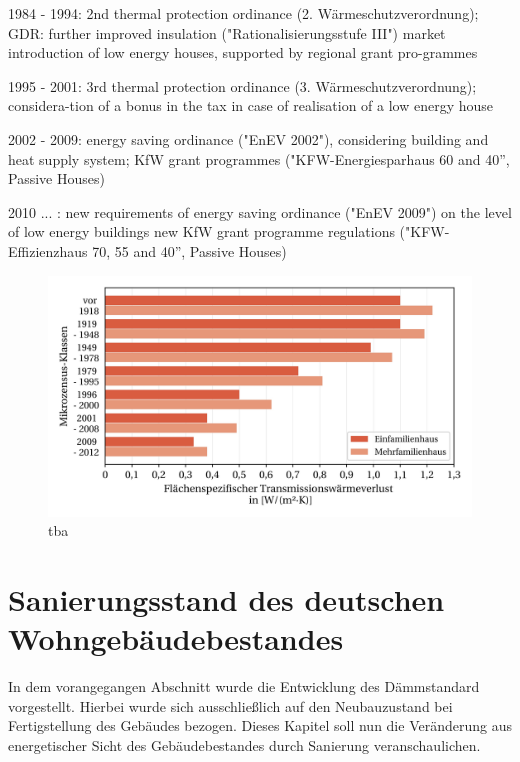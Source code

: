 1984 - 1994: 2nd thermal protection ordinance (2. Wärmeschutzverordnung); GDR: further improved insulation ("Rationalisierungsstufe III")
market introduction of low energy houses, supported by regional grant pro-grammes

1995 - 2001: 3rd thermal protection ordinance (3. Wärmeschutzverordnung); considera-tion of a bonus in the tax in case of realisation of a low energy house

2002 - 2009: energy saving ordinance ("EnEV 2002"), considering building and heat supply system; KfW grant programmes ("KFW-Energiesparhaus 60 and 40”, Passive Houses)

2010 ... : new requirements of energy saving ordinance ("EnEV 2009") on the level of low energy buildings
new KfW grant programme regulations ("KFW-Effizienzhaus 70, 55 and 40”, Passive Houses)

\begin{figure}[H]
	\centering
		\includegraphics{Pictures/TransmissionswaermekoeffizientBaujahr.jpg}
	\caption{tba}
	\label{fig: Abbildung221} 
\end{figure}






\section{Sanierungsstand des deutschen Wohngebäudebestandes}
\label{sec:Sektion 23}

In dem vorangegangen Abschnitt wurde die Entwicklung des Dämmstandard vorgestellt. 
Hierbei wurde sich ausschließlich auf den Neubauzustand bei Fertigstellung des Gebäudes bezogen.
Dieses Kapitel soll nun die Veränderung aus energetischer Sicht des Gebäudebestandes durch Sanierung veranschaulichen.

